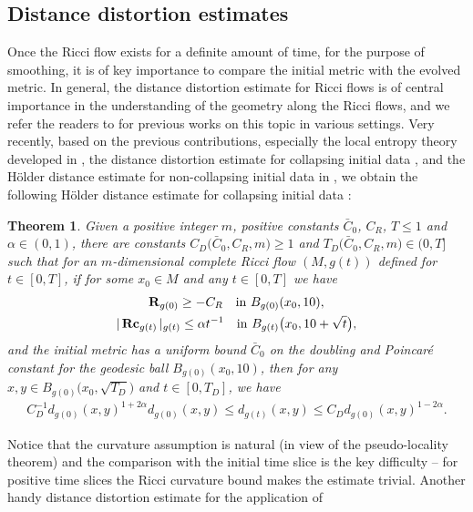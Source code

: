 \documentclass[10pt,a4paper]{amsart}
\numberwithin{equation}{section}
\newtheorem{Theorem}{Theorem}[section]
\newcommand{\Rc}{\operatorname{\bf Rc}}
\newcommand{\Sc}{\mathbf{R}}
\begin{document}
\subsection{Distance distortion estimates}\label{section4.3}
Once the Ricci flow exists for a definite amount of time, for the purpose of
smoothing, it is of key importance to compare the initial metric with the
evolved metric. In general, the distance distortion estimate for Ricci flows
is of central importance in the understanding of the geometry along the Ricci
flows, and we refer the readers to \cite{BZ17, BZ19,CW12,CW19,CW14,H95,Foxy1808, TW15} for previous works on this topic in various settings.
Very recently, based on the previous contributions, especially the local
entropy theory developed in \cite{Wang18}, the distance distortion estimate for
collapsing initial data \cite{Foxy1808}, and the H\"older distance estimate for
non-collapsing initial data in \cite{HKRX18}, we obtain the following H\"older
distance estimate for collapsing initial data \cite[Theorem~A.1]{HW20b}:
\begin{Theorem}\label{thm: HW20b2}
Given a positive integer $m$, positive constants $\bar{C}_0$, $C_R$, $T\le 1$
and $\alpha\in (0,1)$, there are constants
$C_D\big(\bar{C}_0,C_R,m\big)\ge 1$ and $T_D\big(\bar{C}_0,C_R,m\big)\in (0,T]$ such that for an
$m$-di\-men\-sio\-nal complete Ricci flow $(M,g(t))$ defined for $t\in [0,T]$, if
for some $x_0\in M$ and any $t\in [0,T]$ we have
\begin{gather*}
\Sc_{g(0)}\ge -C_R\quad \text{in}\ B_{g(0)}(x_0,10),\\ %
 |\Rc_{g(t)} |_{g(t)}\le \alpha t^{-1}\quad \text{in}\
B_{g(t)}\big(x_0,10+\sqrt{t}\big),%
\end{gather*}
and the initial metric has a uniform bound $\bar{C}_0$ on the doubling and
Poincar\'e constant for the geodesic ball $B_{g(0)}(x_0,10)$, then
for any $x,y\in B_{g(0)}\big(x_0,\sqrt{T_D}\big)$ and $t\in [0,T_D]$, we
have
\begin{gather*}
C_D^{-1}d_{g(0)}(x,y)^{1+2\alpha}d_{g(0)}(x,y) \le d_{g(t)}(x,y) \le
C_Dd_{g(0)}(x,y)^{1-2\alpha}.
\end{gather*}
\end{Theorem}
Notice that the curvature assumption is natural (in view of the pseudo-locality
theorem) and the comparison with the initial time slice is the key difficulty
-- for positive time slices the Ricci curvature bound makes the estimate
trivial. Another handy distance distortion estimate for the application of
\end{document}
